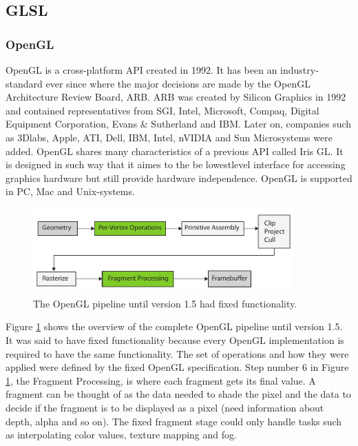 \subsection{GLSL}

\subsubsection{OpenGL}

OpenGL is a cross-platform API created in 1992. It has been an industry-standard ever since where the major decisions are made by the OpenGL Architecture Review Board, ARB. ARB was created by Silicon Graphics in 1992 and contained representatives from SGI, Intel, Microsoft, Compaq, Digital Equipment Corporation, Evans \& Sutherland and IBM. Later on, companies such as 3Dlabs, Apple, ATI, Dell, IBM, Intel, nVIDIA and Sun Microsystems were added. OpenGL shares many characteristics of a previous API called Iris GL. It is designed in such way that it aimes to the be lowestlevel interface for accessing graphics hardware but still provide hardware independence. OpenGL is supported in PC, Mac and Unix-systems.

\begin{figure}[ht!]
\centering
\includegraphics[width=100mm]{img/glpipeline.pdf}
\caption{The OpenGL pipeline until version 1.5 had fixed functionality.}
\label{glfixed}
\end{figure}

Figure \ref{glfixed} shows the overview of the complete OpenGL pipeline until version 1.5. It was said to have fixed functionality because every OpenGL implementation is required to have the same functionality. The set of operations and how they were applied were defined by the fixed OpenGL specification. Step number 6 in Figure \ref{glfixed}, the Fragment Processing, is where each fragment gets its final value. A fragment can be thought of as the data needed to shade the pixel and the data to decide if the fragment is to be displayed as a pixel (need information about depth, alpha and so on). The fixed fragment stage could only handle tasks such as interpolating color values, texture mapping and fog. 

